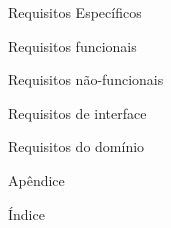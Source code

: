 \documentclass[
	article,			%
	11pt,				%
	oneside,			%
	a4paper,			%
	english,			%
	brazil,				%
	sumario=tradicional
	]{abntex2}
\begin{document}
Requisitos Específicos\dotfill \pageref{RequisitosEspecificos}

\hspace{1cm}Requisitos funcionais\dotfill \pageref{RequisitosFuncionais}

\hspace{1cm}Requisitos não-funcionais\dotfill \pageref{RequisitosNaoFuncionais}

\hspace{1cm}Requisitos de interface\dotfill \pageref{RequisitosInterface}

\hspace{1cm}Requisitos do domínio\dotfill \pageref{RequisitosDominio}

Apêndice\dotfill \pageref{Apendice}

Índice\dotfill \pageref{Indice}
\end{document}
